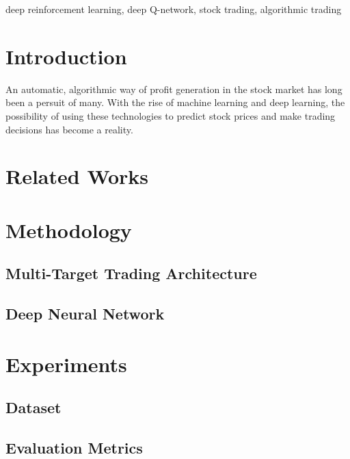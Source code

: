 \documentclass[conference]{IEEEtran}
\begin{document}
\begin{IEEEkeywords}
deep reinforcement learning, deep Q-network, stock trading, algorithmic trading
\end{IEEEkeywords}

\section{Introduction}

An automatic, algorithmic way of profit generation in the stock market has long been a persuit of many. With the rise of machine learning and deep learning, the possibility of using these technologies to predict stock prices and make trading decisions has become a reality.


\section{Related Works}


\section{Methodology}

\subsection{Multi-Target Trading Architecture}


\subsection{Deep Neural Network}


\section{Experiments}

\subsection{Dataset}


\subsection{Evaluation Metrics}
\end{document}
